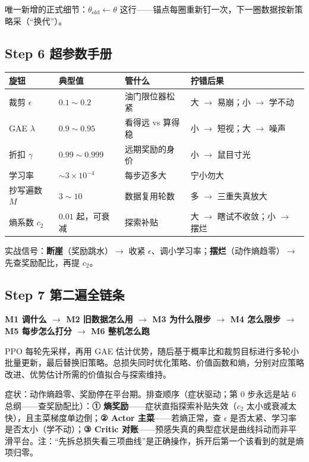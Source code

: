 \documentclass[UTF8,12pt,a4paper]{ctexrep}
\newcommand{\pin}[1]{\begin{pinbox}#1\end{pinbox}}
\newcommand{\selfcheck}[1]{\begin{checkb}#1\end{checkb}}
\newcommand{\flow}[1]{\par\medskip\noindent
  \begin{tcolorbox}[colback=main!6,colframe=main!6,boxrule=0pt,arc=2pt,
    left=8pt,right=8pt,top=5pt,bottom=5pt,halign=center,
    before skip=8pt,after skip=8pt]
    \color{main!85!black}\bfseries #1
  \end{tcolorbox}\par\medskip}
\begin{document}
唯一新增的正式细节：$\theta_{\mathrm{old}} \leftarrow \theta$ 这行——锚点每圈重新钉一次，下一圈数据按新策略采（``换代''）。

\subsection*{Step 6 \; 超参数手册}

\begin{center}
\small
{}
\begin{tabular}{l|l|l|l}
\toprule
旋钮 & 典型值 & 管什么 & 拧错后果\\
\midrule
裁剪 $\epsilon$ & $0.1\sim0.2$ & 油门限位器松紧 & 大 $\to$ 易崩；小 $\to$ 学不动\\
GAE $\lambda$ & $0.9\sim0.95$ & 看得远 vs 算得稳 & 小 $\to$ 短视；大 $\to$ 噪声\\
折扣 $\gamma$ & $0.99\sim0.999$ & 远期奖励的身价 & 小 $\to$ 鼠目寸光\\
学习率 & $\sim 3\times10^{-4}$ & 每步迈多大 & 宁小勿大\\
抄写遍数 $M$ & $3\sim10$ & 数据复用轮数 & 多 $\to$ 三重失真放大\\
熵系数 $c_2$ & $0.01$ 起，可衰减 & 探索补贴 & 大 $\to$ 瞎试不收敛；小 $\to$ 摆烂\\
\bottomrule
\end{tabular}
\end{center}

实战信号：\textbf{断崖}（奖励跳水）$\to$ 收紧 $\epsilon$、调小学习率；\textbf{摆烂}（动作熵趋零）$\to$ 先查奖励配比，再提 $c_2$。

\subsection*{Step 7 \; 第二遍全链条}

\flow{M1 调什么 $\to$ M2 旧数据怎么用 $\to$ M3 为什么限步 $\to$ M4 怎么限步 $\to$ M5 每步怎么打分 $\to$ M6 整机怎么跑}

\pin{PPO 每轮先采样，再用 GAE 估计优势，随后基于概率比和裁剪目标进行多轮小批量更新，最后替换旧策略。总损失同时优化策略、价值函数和熵，分别对应策略改进、优势估计所需的价值拟合与探索维持。}

\selfcheck{症状：动作熵趋零、奖励停在平台期。\quad 排查顺序（症状驱动；第 0 步永远是站 6 总纲——查奖励配比）：\textbf{① 熵奖励}——症状直指探索补贴失效（$c_2$ 太小或衰减太快），且主菜梯度单边倒；\textbf{② Actor 主菜}——若熵正常，查 $\epsilon$ 是否太紧、学习率是否太小（学不动）；\textbf{③ Critic 对账}——预感失真的典型症状是曲线抖动而非平滑平台。注：``先拆总损失看三项曲线''是正确操作，拆开后第一个该看到的就是熵项归零。}
\end{document}
